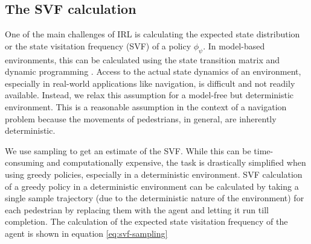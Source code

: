 \subsection{The SVF calculation}
One of the main challenges of IRL is calculating the expected state distribution or the state visitation frequency (SVF) of a policy $\phi_{\psi}$. In model-based environments, this can be calculated using the state transition matrix and dynamic programming \cite{wulfmeier2015maximum}. Access to the actual state dynamics of an environment, especially in real-world applications like navigation, is difficult and not readily available. Instead, we relax this assumption for a model-free but deterministic environment. This is a reasonable assumption in the context of a navigation problem because the movements of pedestrians, in general, are inherently deterministic. %

We use sampling to get an estimate of the SVF. While this can be time-consuming and computationally expensive, the task is drastically simplified when using greedy policies, especially in a deterministic environment. SVF calculation of a greedy policy in a deterministic environment can be calculated by taking a single sample trajectory (due to the deterministic nature of the environment) for each pedestrian by replacing them with the agent and letting it run till completion. The calculation of the expected state visitation frequency of the agent is shown in equation \autoref{eq:svf-sampling}

